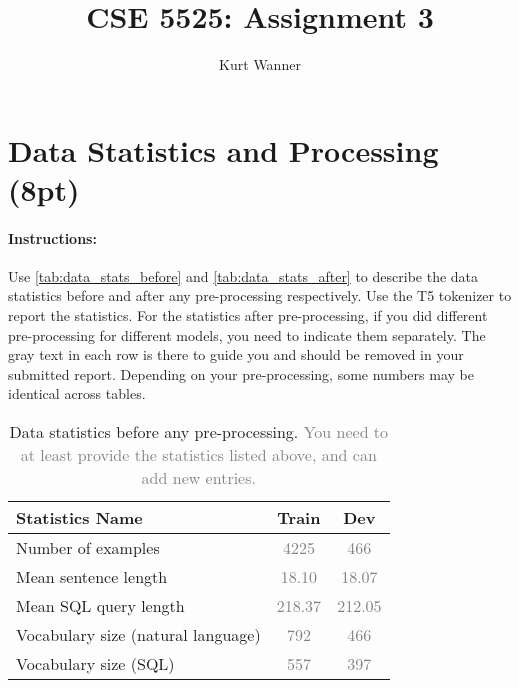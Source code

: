 \documentclass{article}
\title{CSE 5525: Assignment 3}
\author{Kurt Wanner}
\date{}
\begin{document}
\maketitle


\section{Data Statistics and Processing (8pt)}
\paragraph{Instructions:} Use \autoref{tab:data_stats_before} and \autoref{tab:data_stats_after} to describe the data statistics before and after any pre-processing respectively. 
Use the T5 tokenizer to report the statistics. 
For the statistics after pre-processing, if you did different pre-processing for different models, you need to indicate them separately.
The gray text in each row is there to guide you and should be removed in your submitted report.
Depending on your pre-processing, some numbers may be identical across tables. 

\begin{table}[h!]
\centering
\begin{tabular}{lcc}
\toprule
Statistics Name & Train & Dev \\
\midrule
Number of examples & \textcolor{gray}{4225} & \textcolor{gray}{466} \\
Mean sentence length & \textcolor{gray}{18.10}& \textcolor{gray}{18.07} \\
Mean SQL query length & \textcolor{gray}{218.37}& \textcolor{gray}{212.05}  \\
Vocabulary size (natural language)& \textcolor{gray}{792}& \textcolor{gray}{466}  \\
Vocabulary size (SQL)& \textcolor{gray}{557}& \textcolor{gray}{397}  \\
\bottomrule
\end{tabular}
\caption{Data statistics before any pre-processing. \textcolor{gray}{You need to at least provide the statistics listed above, and can add new entries.}}
\label{tab:data_stats_before}
\end{table}
\end{document}
